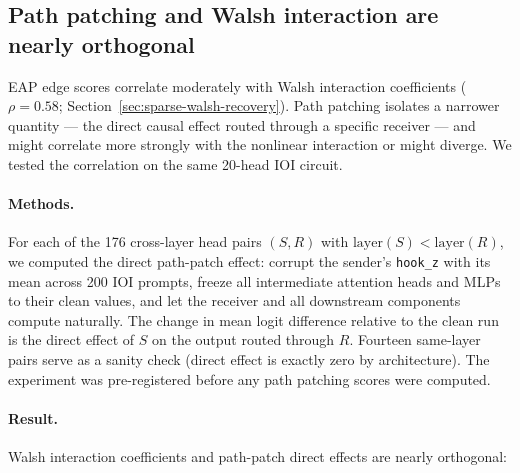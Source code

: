 %
%

\subsection{Path patching and Walsh interaction are nearly orthogonal}
\label{sec:path-patching}

EAP edge scores correlate moderately with Walsh interaction coefficients
($\rho = 0.58$; Section~\ref{sec:sparse-walsh-recovery}). Path patching
isolates a narrower quantity --- the direct causal effect routed through a
specific receiver --- and might correlate more strongly with the
nonlinear interaction or might diverge. We tested the correlation on the same
20-head IOI circuit.

\paragraph{Methods.}

For each of the 176 cross-layer head pairs $(S, R)$ with
$\text{layer}(S) < \text{layer}(R)$, we computed the direct path-patch
effect: corrupt the sender's \texttt{hook\_z} with its mean across 200
IOI prompts, freeze all intermediate attention heads and MLPs to their
clean values, and let the receiver and all downstream components compute
naturally. The change in mean logit difference relative to the clean run
is the direct effect of $S$ on the output routed through $R$. Fourteen
same-layer pairs serve as a sanity check (direct effect is exactly zero
by architecture). The experiment was pre-registered before any path
patching scores were computed.

\paragraph{Result.}

Walsh interaction coefficients and path-patch direct effects are nearly
orthogonal:

